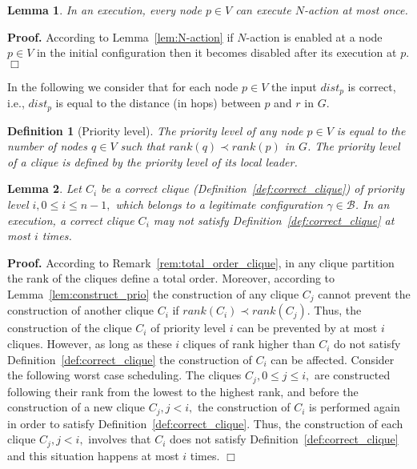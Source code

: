 \documentclass[11pt,letterpaper,onecolumn]{article}
\newtheorem{definition}{Definition}
\newtheorem{lemma}{Lemma}
\newenvironment{proof}{\noindent \begin{rm}{\textbf{Proof.} }}{\hspace*{\fill}$\Box$\par\end{rm} \vspace{.3cm}}
\begin{document}
\begin{lemma}
\label{lem:N-action_steps}
In an execution, every node $p \in V$ can execute $N$-action at most once.
\end{lemma}

\begin{proof}
According to Lemma~\ref{lem:N-action} if $N$-action is enabled at a node $p \in V$ in the initial configuration then it becomes disabled after its execution at $p$.
\end{proof}

In the following we consider that for each node $p \in V$ the input $dist_p$ is correct, i.e., $dist_p$ is equal to the distance (in hops) between $p$ and $r$ in $G$.

\begin{definition}[Priority level]
The \emph{priority level} of any node $p \in V$ is equal to the number of nodes $q \in V$ such that $rank(q) \prec rank(p)$ in $G$. The priority level of a clique is defined by the priority level of its local leader.
\end{definition}

\begin{lemma}
Let $C_i$ be a correct clique (Definition~\ref{def:correct_clique}) of priority level $i, 0 \leq i \leq n-1,$ which belongs to a legitimate configuration $\gamma \in \mathcal{B}$. In an execution, a correct clique $C_i$ may not satisfy Definition~\ref{def:correct_clique} at most $i$ times.
\end{lemma}

\begin{proof}
According to Remark~\ref{rem:total_order_clique}, in any clique partition the rank of the cliques define a total order. Moreover, according to Lemma~\ref{lem:construct_prio} the construction of any clique $C_j$ cannot prevent the construction of another clique $C_i$ if $rank(C_i) \prec rank(C_j)$. Thus, the construction of the clique $C_i$ of priority level $i$ can be prevented by at most $i$ cliques. However, as long as these $i$ cliques of rank higher than $C_i$ do not satisfy Definition~\ref{def:correct_clique} the construction of $C_i$ can be affected. Consider the following worst case scheduling. The cliques $C_j, 0 \leq j \leq i,$ are constructed following their rank from the lowest to the highest rank, and before the construction of a new clique $C_j, j<i,$ the construction of $C_i$ is performed again in order to satisfy Definition~\ref{def:correct_clique}. Thus, the construction of each clique $C_j, j<i,$ involves that $C_i$ does not satisfy Definition~\ref{def:correct_clique} and this situation happens at most $i$ times.
\end{proof}
\end{document}
